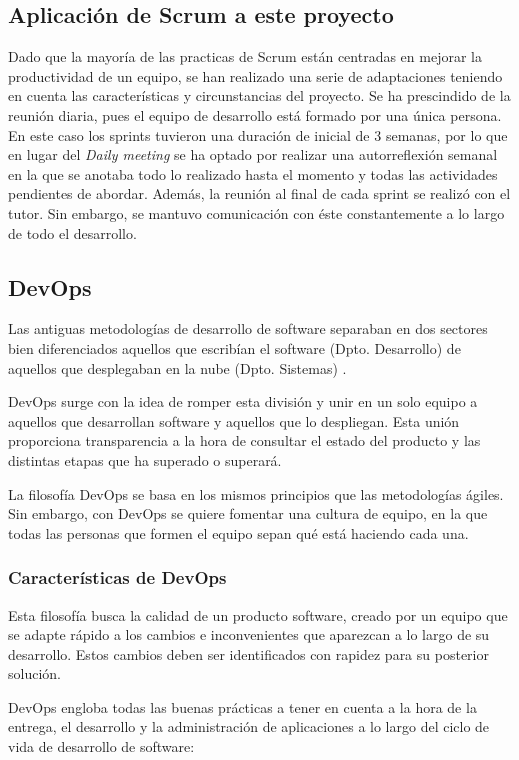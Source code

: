 \subsection{Aplicación de Scrum a este proyecto}
Dado que la mayoría de las practicas de Scrum están centradas en mejorar la productividad de un equipo, se han realizado una serie de adaptaciones teniendo en cuenta las características y circunstancias del proyecto. Se ha prescindido de la reunión diaria, pues el equipo de desarrollo está formado por una única persona. En este caso los sprints tuvieron una duración de inicial de 3 semanas, por lo que en lugar del \textit{Daily meeting} se ha optado por realizar una autorreflexión semanal en la que se anotaba todo lo realizado hasta el momento y todas las actividades pendientes de abordar. Además, la reunión al final de cada sprint se realizó con el tutor. Sin embargo, se mantuvo comunicación con éste constantemente a lo largo de todo el desarrollo.

\subsection{DevOps}

Las antiguas metodologías de desarrollo de software separaban en dos sectores bien diferenciados aquellos que escribían el software (Dpto. Desarrollo) de aquellos que desplegaban en la nube (Dpto. Sistemas) \cite{devops5}.

DevOps surge con la idea de romper esta división y unir en un solo equipo a aquellos que desarrollan software y aquellos que lo despliegan. Esta unión proporciona transparencia a la hora de consultar el estado del producto y las distintas etapas que ha superado o superará.

La filosofía DevOps se basa en los mismos principios que las metodologías ágiles. Sin embargo, con DevOps se quiere fomentar una cultura de equipo, en la que todas las personas que formen el equipo sepan qué está haciendo cada una.

\subsubsection{Características de DevOps}
Esta filosofía busca la calidad de un producto software, creado por un equipo que se adapte rápido a los cambios e inconvenientes que aparezcan a lo largo de su desarrollo. Estos cambios deben ser identificados con rapidez para su posterior solución.

DevOps engloba todas las buenas prácticas a tener en cuenta a la hora de la entrega, el desarrollo y la administración de aplicaciones a lo largo del ciclo de vida de desarrollo de software: \cite{devops7}


